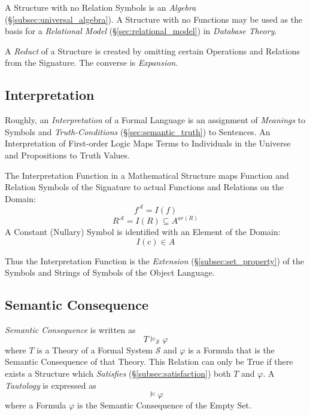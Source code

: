 \documentclass{article}
\begin{document}
A Structure with no Relation Symbols is an \emph{Algebra}
(\S\ref{subsec:universal_algebra}). A Structure with no Functions may
be used as the basis for a \emph{Relational Model}
(\S\ref{sec:relational_model}) in \emph{Database Theory}.

A \emph{Reduct} of a Structure is created by omitting certain
Operations and Relations from the Signature. The converse is
\emph{Expansion}.



\subsection{Interpretation}\label{subsec:interpretation}

Roughly, an \emph{Interpretation} of a Formal Language is an
assignment of \emph{Meanings} to Symbols and \emph{Truth-Conditions}
(\S\ref{sec:semantic_truth}) to Sentences. An Interpretation of
First-order Logic Maps Terms to Individuals in the Universe and
Propositions to Truth Values.

The Interpretation Function in a Mathematical Structure maps Function
and Relation Symbols of the Signature to actual Functions and
Relations on the Domain:
\[
    f^{\mathcal{A}} = I (f)
\]
\[
    R^{\mathcal{A}} = I (R) \subseteq A^{ar(R)}
\]
A Constant (Nullary) Symbol is identified with an Element of the
Domain:
\[
    I(c) \in A
\]

Thus the Interpretation Function is the \emph{Extension}
(\S\ref{subsec:set_property}) of the Symbols and Strings of Symbols of
the Object Language.



\subsection{Semantic Consequence}\label{subsec:semantic_consequence}

\emph{Semantic Consequence} is written as
\[
    T \vDash_{\mathcal{S}} \varphi
\]
where $T$ is a Theory of a Formal System $\mathcal{S}$ and $\varphi$
is a Formula that is the Semantic Consequence of that Theory. This
Relation can only be True if there exists a Structure which
\emph{Satisfies} (\S\ref{subsec:satisfaction}) both $T$ and
$\varphi$. A \emph{Tautology} is expressed as
\[
    \vDash {\varphi}
\]
where a Formula $\varphi$ is the Semantic Consequence of the Empty
Set.
\end{document}
